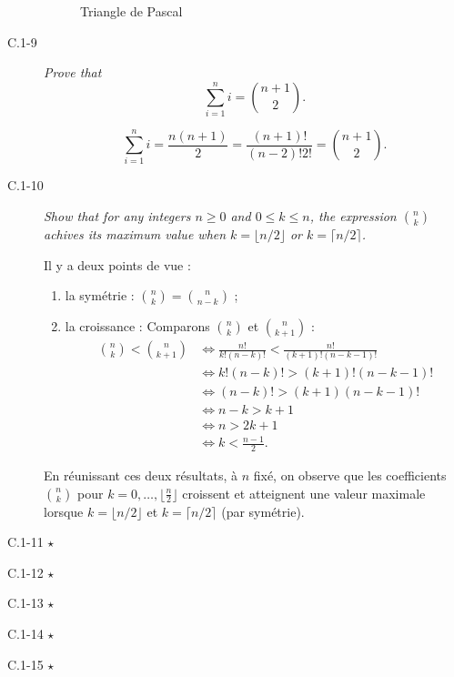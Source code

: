 \begin{description}
\begin{ex}
\begin{figure}[H]
        \caption{Triangle de Pascal}
        \label{fig:}
      \end{figure}
    \end{ex}
  \item[C.1-9] {\itshape Prove that \[ \sum_{i=1}^n i = \binom{n+1}{2}.\]}
    \begin{ex}
      \[\sum_{i=1}^ni = \frac{n(n+1)}{2} = \frac{(n+1)!}{(n-2)!2!} = \binom{n+1}{2}.\]
    \end{ex}
  \item[C.1-10] {\itshape Show that for any integers $n \ge 0$ and $ 0\le k \le n$, the expression $\binom{n}{k}$ achives its maximum value when $k = \lfloor n/2 \rfloor$ or $k = \lceil n/2 \rceil$.}
    \begin{ex}
      Il y a deux points de vue :
      \begin{enumerate}
        \item la sym\'etrie : $\binom{n}{k} = \binom{n}{n-k}$ ;
        \item la croissance :
        Comparons $\binom{n}{k}$ et $\binom{n}{k+1}$ : 
        \begin{align*}
          \binom{n}{k} < \binom{n}{k+1} &\iff \frac{n!}{k!(n-k)!} < \frac{n!}{(k+1)!(n-k-1)!}\\
          &\iff k!(n-k)! > (k+1)!(n-k-1)!\\
          &\iff (n-k)! > (k+1)(n-k-1)!\\
          &\iff n-k>k+1\\
          &\iff n > 2k+1\\
          &\iff k<\frac{n-1}{2}.
        \end{align*}
      \end{enumerate}
      En r\'eunissant ces deux r\'esultats, \`a $n$ fix\'e, on observe que les coefficients $\binom{n}{k}$ pour $k = 0, \ldots, \lfloor \frac{n}{2} \rfloor$ croissent et atteignent une valeur maximale lorsque $k = \lfloor n/2 \rfloor$ et $ k = \lceil n/2 \rceil$ (par sym\'etrie).
    \end{ex}

  \item[C.1-11 $\star$] {\itshape }
  \item[C.1-12 $\star$] {\itshape }
  \item[C.1-13 $\star$] {\itshape }
  \item[C.1-14 $\star$] {\itshape }
  \item[C.1-15 $\star$] {\itshape }
\end{description}
